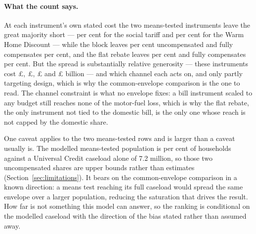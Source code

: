 \paragraph{What the count says.} At each instrument's own stated cost the two means-tested instruments leave the great majority short --- \genSocialTariffUncompensatedShare{} per cent for the social tariff and \genWhdUncompensatedShare{} per cent for the Warm Home Discount --- while the block leaves \genJrfUncompensatedShare{} per cent uncompensated and fully compensates \genJrfFullyCompensatedShare{} per cent, and the flat rebate leaves \genRebateUncompensatedShare{} per cent and fully compensates \genRebateFullyCompensatedShare{} per cent. But the spread is substantially relative generosity --- these instruments cost \pounds \genSocialTariffCostBn{}, \pounds \genWhdCostBn{}, \pounds \genJrfCostBn{} and \pounds \genRebateCostBn{} billion --- and which channel each acts on, and only partly targeting design, which is why the common-envelope comparison is the one to read. The channel constraint is what no envelope fixes: a bill instrument scaled to any budget still reaches none of the motor-fuel loss, which is why the flat rebate, the only instrument not tied to the domestic bill, is the only one whose reach is not capped by the domestic share.

One caveat applies to the two means-tested rows and is larger than a caveat usually is. The modelled means-tested population is \genMeansTestedShareHouseholds{} per cent of households against a Universal Credit caseload alone of 7.2 million, so those two uncompensated shares are upper bounds rather than estimates (Section~\ref{sec:limitations}). It bears on the common-envelope comparison in a known direction: a means test reaching its full caseload would spread the same envelope over a larger population, reducing the saturation that drives the result. How far is not something this model can answer, so the ranking is conditional on the modelled caseload with the direction of the bias stated rather than assumed away.
